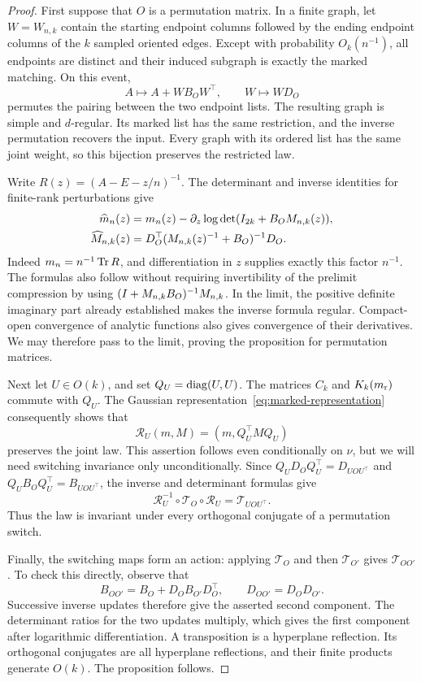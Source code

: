 \begin{proof}
First suppose that \(O\) is a permutation matrix. In a finite graph, let
\(W=W_{n,k}\) contain the starting endpoint columns followed by the ending
endpoint columns of the \(k\) sampled oriented edges. Except with probability
\(O_k(n^{-1})\), all endpoints are distinct and their induced subgraph is
exactly the marked matching. On this event,
\[
 A\longmapsto A+WB_OW^\top,\qquad W\longmapsto WD_O
\]
permutes the pairing between the two endpoint lists. The resulting graph is
simple and \(d\)-regular. Its marked list has the same restriction, and the
inverse permutation recovers the input. Every graph with its ordered list
has the same joint weight, so this bijection preserves the restricted law.

Write \(R(z)=(A-E-z/n)^{-1}\). The determinant and inverse identities for
finite-rank perturbations give
\begin{align*}
 \widehat m_n(z)
 &=m_n(z)-\partial_z\log\det(I_{2k}+B_OM_{n,k}(z)),\\
 \widehat M_{n,k}(z)
 &=D_O^\top(M_{n,k}(z)^{-1}+B_O)^{-1}D_O.
\end{align*}
Indeed \(m_n=n^{-1}\operatorname{Tr} R\), and differentiation in \(z\) supplies exactly
this factor \(n^{-1}\). The formulas also follow without requiring
invertibility of the prelimit compression by using
\((I+M_{n,k}B_O)^{-1}M_{n,k}\). In the limit, the positive definite
imaginary part already established makes the inverse formula regular.
Compact-open convergence of analytic functions also gives convergence of
their derivatives. We may therefore pass to the limit, proving the
proposition for permutation matrices.

Next let \(U\in O(k)\), and set \(Q_U=\operatorname{diag}(U,U)\).
The matrices \(C_k\) and \(K_k(m_{\rm r})\) commute with \(Q_U\).
The Gaussian representation~\eqref{eq:marked-representation} consequently
shows that
\[
 \mathcal R_U(m,M)=(m,Q_U^\top M Q_U)
\]
preserves the joint law. This assertion follows even conditionally on
\(\nu\), but we will need switching invariance only unconditionally.
Since \(Q_UD_OQ_U^\top=D_{UOU^\top}\) and
\(Q_UB_OQ_U^\top=B_{UOU^\top}\), the inverse and determinant formulas give
\[
 \mathcal R_U^{-1}\circ\mathcal T_O\circ\mathcal R_U
       =\mathcal T_{UOU^\top}.
\]
Thus the law is invariant under every orthogonal conjugate of a
permutation switch.

Finally, the switching maps form an action:
applying \(\mathcal T_O\) and then \(\mathcal T_{O'}\) gives
\(\mathcal T_{OO'}\). To check this directly, observe that
\begin{equation}\label{eq:sw-composition}
 B_{OO'}=B_O+D_OB_{O'}D_O^\top,\qquad D_{OO'}=D_OD_{O'}.
\end{equation}
Successive inverse updates therefore give the asserted second component.
The determinant ratios for the two updates multiply, which gives the first
component after logarithmic differentiation. A transposition is a
hyperplane reflection. Its orthogonal conjugates are all hyperplane
reflections, and their finite products generate \(O(k)\). The proposition
follows.
\end{proof}

